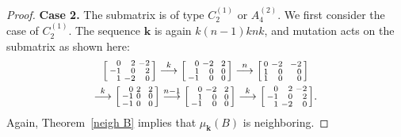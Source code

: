\documentclass{amsart}
\theoremstyle{definition}
\theoremstyle{remark}
\numberwithin{equation}{section}
\newcommand{\0}{{\mathbf{0}}}
\newcommand{\kk}{{\boldsymbol{k}}}
\begin{document}
\begin{proof}
\noindent
\textbf{Case 2.}
The submatrix is of type $C_2^{(1)}$ or $A_4^{(2)}$.
We first consider the case of $C_2^{(1)}$.
The sequence $\kk$ is again $k(n-1)knk$, and mutation acts on the submatrix as shown here:
\begin{multline*}
\begin{bsmallmatrix*}[r]
0&2&-2\\
-1&0&2\\
1&-2&0
\end{bsmallmatrix*}
\overset{k}{\longrightarrow}
\begin{bsmallmatrix*}[r]
0&-2&\,\,\,2\\
1&0&0\\
-1&0&0
\end{bsmallmatrix*}
\overset{n}{\longrightarrow}
\begin{bsmallmatrix*}[r]
0&-2&\,\,\,-2\\
1&0&0\\
1&0&0
\end{bsmallmatrix*}\\
\overset{k}{\longrightarrow}
\begin{bsmallmatrix*}[r]
0&2&\,\,\,2\\
-1&0&0\\
-1&0&0
\end{bsmallmatrix*}
\overset{n-1}{\longrightarrow}
\begin{bsmallmatrix*}[r]
0&-2&\,\,\,2\\
1&0&0\\
-1&0&0
\end{bsmallmatrix*}
\overset{k}{\longrightarrow}
\begin{bsmallmatrix*}[r]
0&2&-2\\
-1&0&2\\
1&-2&0
\end{bsmallmatrix*}.
\end{multline*}
Again, Theorem~\ref{neigh B} implies that $\mu_\kk(B)$ is neighboring.


\end{proof}
\end{document}
